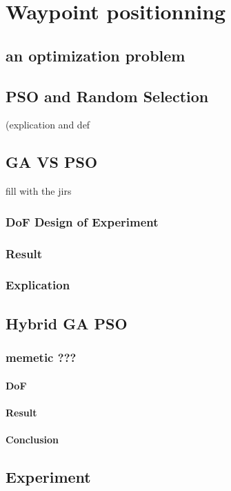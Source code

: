 \chapter{Waypoint positionning} 


\minitoc


\section{an optimization problem }

\section{PSO and Random Selection }(explication and def 

\section{GA VS PSO }\label{sec:GAvsPSO} 
fill with the jirs 
	\subsection{DoF Design of Experiment}
	\subsection{Result}
	\subsection{Explication}

\section{Hybrid GA PSO}
	\subsection{memetic ???}
		\subsubsection{DoF}
		\subsubsection{Result}
		\subsubsection{Conclusion}
		
\section{Experiment}
